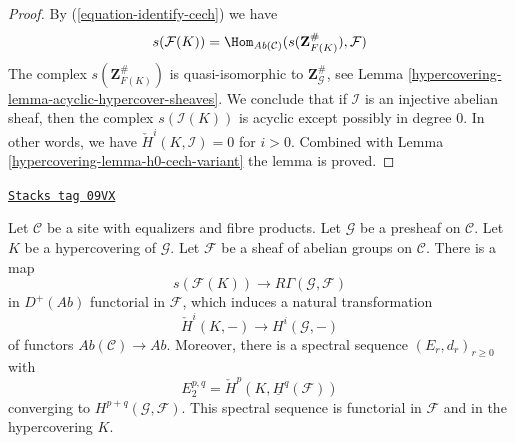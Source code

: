 \begin{proof}

By (\ref{equation-identify-cech}) we have
$$
s(\mathcal{F}(K))
=
\Hom_{\textit{Ab}(\mathcal{C})}(s(\mathbf{Z}_{F(K)}^\#), \mathcal{F})
$$
The complex $s(\mathbf{Z}_{F(K)}^\#)$ is quasi-isomorphic
to $\mathbf{Z}_\mathcal{G}^\#$, see
Lemma \ref{hypercovering-lemma-acyclic-hypercover-sheaves}. We conclude
that if $\mathcal{I}$ is an injective abelian sheaf, then
the complex $s(\mathcal{I}(K))$ is acyclic except possibly in degree $0$.
In other words, we have $\check{H}^i(K, \mathcal{I}) = 0$
for $i > 0$. Combined with Lemma \ref{hypercovering-lemma-h0-cech-variant}
the lemma is proved.
\end{proof}

\begin{lemma}
\label{hypercovering-lemma-cech-spectral-sequence-variant}
\href{https://stacks.math.columbia.edu/tag/09VX}{\texttt{Stacks tag 09VX}}

Let $\mathcal{C}$ be a site with equalizers and fibre products.
Let $\mathcal{G}$ be a presheaf on $\mathcal{C}$.
Let $K$ be a hypercovering of $\mathcal{G}$.
Let $\mathcal{F}$ be a sheaf of abelian groups on $\mathcal{C}$.
There is a map
$$
s(\mathcal{F}(K)) \longrightarrow R\Gamma(\mathcal{G}, \mathcal{F})
$$
in $D^{+}(\textit{Ab})$ functorial in $\mathcal{F}$, which induces
a natural transformation
$$
\check{H}^i(K, -) \longrightarrow H^i(\mathcal{G}, -)
$$
of functors $\textit{Ab}(\mathcal{C}) \to \textit{Ab}$. Moreover,
there is a spectral sequence $(E_r, d_r)_{r \geq 0}$ with
$$
E_2^{p, q} = \check{H}^p(K, \underline{H}^q(\mathcal{F}))
$$
converging to $H^{p + q}(\mathcal{G}, \mathcal{F})$.
This spectral sequence is functorial in $\mathcal{F}$ and
in the hypercovering $K$.
\end{lemma}

